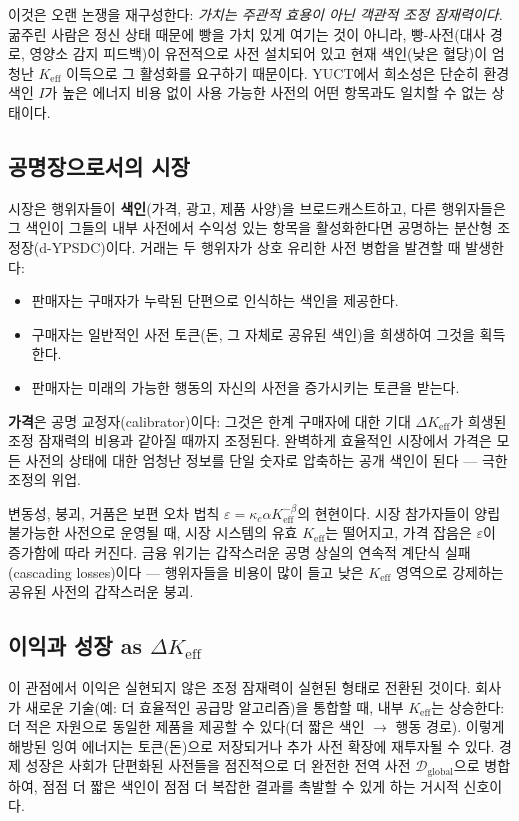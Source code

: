 \documentclass[12pt,a4paper]{article}
\newcommand{\Keff}{K_{\mathrm{eff}}}
\begin{document}
	이것은 오랜 논쟁을 재구성한다: \emph{가치는 주관적 효용이 아닌 객관적 조정 잠재력이다.} 굶주린 사람은 정신 상태 때문에 빵을 가치 있게 여기는 것이 아니라, 빵-사전(대사 경로, 영양소 감지 피드백)이 유전적으로 사전 설치되어 있고 현재 색인(낮은 혈당)이 엄청난 \(K_{\mathrm{eff}}\) 이득으로 그 활성화를 요구하기 때문이다. YUCT에서 희소성은 단순히 환경 색인 \(I\)가 높은 에너지 비용 없이 사용 가능한 사전의 어떤 항목과도 일치할 수 없는 상태이다.
	
	\subsection{공명장으로서의 시장}
	
	시장은 행위자들이 \textbf{색인}(가격, 광고, 제품 사양)을 브로드캐스트하고, 다른 행위자들은 그 색인이 그들의 내부 사전에서 수익성 있는 항목을 활성화한다면 공명하는 분산형 조정장(d-YPSDC)이다. 거래는 두 행위자가 상호 유리한 사전 병합을 발견할 때 발생한다:
	\begin{itemize}[leftmargin=*]
		\item 판매자는 구매자가 누락된 단편으로 인식하는 색인을 제공한다.
		\item 구매자는 일반적인 사전 토큰(돈, 그 자체로 공유된 색인)을 희생하여 그것을 획득한다.
		\item 판매자는 미래의 가능한 행동의 자신의 사전을 증가시키는 토큰을 받는다.
	\end{itemize}
	\textbf{가격}은 공명 교정자(calibrator)이다: 그것은 한계 구매자에 대한 기대 \(\Delta\Keff\)가 희생된 조정 잠재력의 비용과 같아질 때까지 조정된다. 완벽하게 효율적인 시장에서 가격은 모든 사전의 상태에 대한 엄청난 정보를 단일 숫자로 압축하는 공개 색인이 된다 — 극한 조정의 위업.
	
	변동성, 붕괴, 거품은 보편 오차 법칙 \(\varepsilon = \kappa_c \alpha \Keff^{-\beta}\)의 현현이다. 시장 참가자들이 양립 불가능한 사전으로 운영될 때, 시장 시스템의 유효 \(\Keff\)는 떨어지고, 가격 잡음은 \(\varepsilon\)이 증가함에 따라 커진다. 금융 위기는 갑작스러운 공명 상실의 연속적 계단식 실패(cascading losses)이다 — 행위자들을 비용이 많이 들고 낮은 \(\Keff\) 영역으로 강제하는 공유된 사전의 갑작스러운 붕괴.
	
	\subsection{이익과 성장 as \(\Delta\Keff\)}
	
	이 관점에서 이익은 실현되지 않은 조정 잠재력이 실현된 형태로 전환된 것이다. 회사가 새로운 기술(예: 더 효율적인 공급망 알고리즘)을 통합할 때, 내부 \(\Keff\)는 상승한다: 더 적은 자원으로 동일한 제품을 제공할 수 있다(더 짧은 색인 \(\rightarrow\) 행동 경로). 이렇게 해방된 잉여 에너지는 토큰(돈)으로 저장되거나 추가 사전 확장에 재투자될 수 있다. 경제 성장은 사회가 단편화된 사전들을 점진적으로 더 완전한 전역 사전 \(\mathcal{D}_{\text{global}}\)으로 병합하여, 점점 더 짧은 색인이 점점 더 복잡한 결과를 촉발할 수 있게 하는 거시적 신호이다.
	
\end{document}
